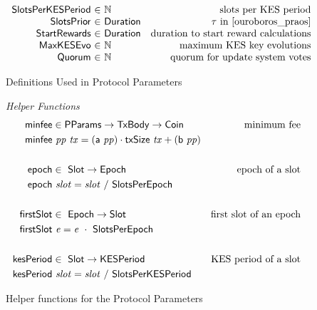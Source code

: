 \begin{figure*}[htb]
\begin{equation*}
\begin{array}{r@{~\in~}lr}
      \SlotsPerKESPeriod & \N & \text{slots per KES period} \\
      \SlotsPrior & \Duration & \tau\text{ in \cite{ouroboros_praos}}\\
      \StartRewards & \Duration & \text{duration to start reward calculations}\\
      \MaxKESEvo & \N & \text{maximum KES key evolutions}\\
      \Quorum & \N & \text{quorum for update system votes}\\
    \end{array}
  \end{equation*}
  \caption{Definitions Used in Protocol Parameters}
  \label{fig:defs:protocol-parameters}
\end{figure*}

\begin{figure*}[htb]
  \emph{Helper Functions}
  \begin{align*}
    \mathsf{minfee} & \in \mathsf{PParams} \to \mathsf{TxBody} \to \mathsf{Coin} & \text{minimum fee}\\
    \mathsf{minfee} & ~\mathit{pp}~\mathit{tx} =
    (\mathsf{a}~\mathit{pp}) \cdot \mathsf{txSize}~\mathit{tx} + (\mathsf{b}~\mathit{pp})
    \\
    \\
    \mathsf{epoch} & \in ~ \mathsf{Slot} \to \mathsf{Epoch} & \text{epoch of a slot}
    \\
    \mathsf{epoch} & ~\mathit{slot} = \mathit{slot}~/~\mathsf{SlotsPerEpoch}
    \\
    \\
    \mathsf{firstSlot} & \in ~ \mathsf{Epoch} \to \mathsf{Slot}
               & \text{first slot of an epoch}
    \\
    \mathsf{firstSlot} & ~\mathit{e} = \mathit{e}~\cdot~\mathsf{SlotsPerEpoch}
    \\
    \\
    \mathsf{kesPeriod} & \in ~ \mathsf{Slot} \to \mathsf{KESPeriod} & \text{KES period of a slot}
    \\
    \mathsf{kesPeriod} & ~\mathit{slot} = \mathit{slot}~/~\mathsf{SlotsPerKESPeriod}
  \end{align*}
  \caption{Helper functions for the Protocol Parameters}
  \label{fig:defs:protocol-parameters-helpers}
\end{figure*}

\clearpage

